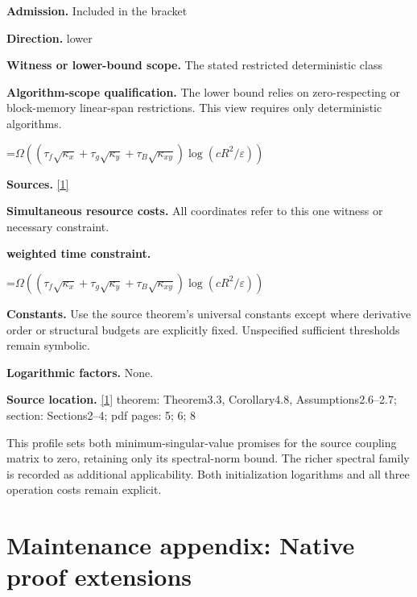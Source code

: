 \documentclass[10pt,a4paper]{article}
\newcommand{\AtlasMath}[1]{\par\begingroup\centering\setbox0=\hbox{$\displaystyle #1$}\ifdim\wd0>1.4\linewidth\typeout{ATLAS WIDE FORMULA: \the\wd0}\fi\ifdim\wd0>\linewidth\resizebox{\linewidth}{!}{\box0}\else\box0\fi\par\endgroup}
\begin{document}
\textbf{Admission.} Included in the bracket



\textbf{Direction.} lower



\textbf{Witness or lower-bound scope.} The stated restricted deterministic class



\textbf{Algorithm-scope qualification.} The lower bound relies on zero-respecting or block-memory linear-span restrictions. This view requires only deterministic algorithms.



\AtlasMath{\Omega((\tau_f\sqrt{\kappa_x}+\tau_g\sqrt{\kappa_y}+\tau_B\sqrt{\kappa_{xy}})\log(cR^2/\varepsilon))}


\textbf{Sources.} \href{https://raw.githubusercontent.com/mlresearch/v267/main/assets/borodich25a/borodich25a.pdf}{[1]}



\textbf{Simultaneous resource costs.} All coordinates refer to this one witness or necessary constraint.



\textbf{weighted time constraint.}



\AtlasMath{\Omega((\tau_f\sqrt{\kappa_x}+\tau_g\sqrt{\kappa_y}+\tau_B\sqrt{\kappa_{xy}})\log(cR^2/\varepsilon))}


\textbf{Constants.} Use the source theorem’s universal constants except where derivative order or structural budgets are explicitly fixed. Unspecified sufficient thresholds remain symbolic.



\textbf{Logarithmic factors.} None.



\textbf{Source location.} \href{https://raw.githubusercontent.com/mlresearch/v267/main/assets/borodich25a/borodich25a.pdf}{[1]} theorem: Theorem3.3, Corollary4.8, Assumptions2.6--2.7; section: Sections2--4; pdf pages: 5; 6; 8



This profile sets both minimum-singular-value promises for the source coupling matrix to zero, retaining only its spectral-norm bound. The richer spectral family is recorded as additional applicability. Both initialization logarithms and all three operation costs remain explicit.



\section{Maintenance appendix: Native proof extensions}
\end{document}
